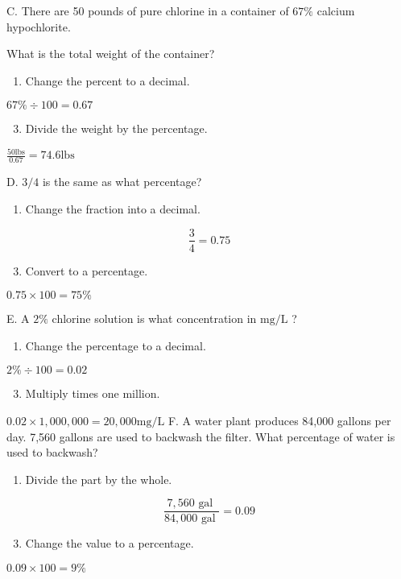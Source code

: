 C. There are 50 pounds of pure chlorine in a container of $67 \%$ calcium hypochlorite.

What is the total weight of the container?

\begin{enumerate}
  \item Change the percent to a decimal.
\end{enumerate}
$67 \% \div 100=0.67$

\begin{enumerate}
  \setcounter{enumi}{2}
  \item Divide the weight by the percentage.
\end{enumerate}
$\frac{50 \mathrm{lbs}}{0.67}=74.6 \mathrm{lbs}$

D. $3 / 4$ is the same as what percentage?

\begin{enumerate}
  \item Change the fraction into a decimal.
\end{enumerate}
$$
\frac{3}{4}=0.75
$$

\begin{enumerate}
  \setcounter{enumi}{2}
  \item Convert to a percentage.
\end{enumerate}
$0.75 \times 100=75 \%$

E. A $2 \%$ chlorine solution is what concentration in $\mathrm{mg} / \mathrm{L}$ ?

\begin{enumerate}
  \item Change the percentage to a decimal.
\end{enumerate}
$2 \% \div 100=0.02$

\begin{enumerate}
  \setcounter{enumi}{2}
  \item Multiply times one million.
\end{enumerate}
$0.02 \times 1,000,000=20,000 \mathrm{mg} / \mathrm{L}$ F. A water plant produces 84,000 gallons per day. 7,560 gallons are used to backwash the filter. What percentage of water is used to backwash?

\begin{enumerate}
  \item Divide the part by the whole.
\end{enumerate}
$$
\frac{7,560 \text { gal }}{84,000 \text { gal }}=0.09
$$

\begin{enumerate}
  \setcounter{enumi}{2}
  \item Change the value to a percentage.
\end{enumerate}
$0.09 \times 100=9 \%$

